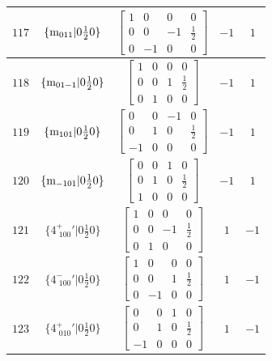 \documentclass[fleqn,8pt]{jsarticle}
\begin{document}
\begin{longtable}{ccccc}
$ 117 $ & $ \{{\rm m}_{011}|0 \frac{1}{2} 0\} $ & $ \begin{bmatrix} 1 & 0 & 0 & 0 \\ 0 & 0 & -1 & \frac{1}{2} \\ 0 & -1 & 0 & 0 \end{bmatrix} $ & $ -1 $ & $ 1 $ \\ \hline
$ 118 $ & $ \{{\rm m}_{01-1}|0 \frac{1}{2} 0\} $ & $ \begin{bmatrix} 1 & 0 & 0 & 0 \\ 0 & 0 & 1 & \frac{1}{2} \\ 0 & 1 & 0 & 0 \end{bmatrix} $ & $ -1 $ & $ 1 $ \\ \hline
$ 119 $ & $ \{{\rm m}_{101}|0 \frac{1}{2} 0\} $ & $ \begin{bmatrix} 0 & 0 & -1 & 0 \\ 0 & 1 & 0 & \frac{1}{2} \\ -1 & 0 & 0 & 0 \end{bmatrix} $ & $ -1 $ & $ 1 $ \\ \hline
$ 120 $ & $ \{{\rm m}_{-101}|0 \frac{1}{2} 0\} $ & $ \begin{bmatrix} 0 & 0 & 1 & 0 \\ 0 & 1 & 0 & \frac{1}{2} \\ 1 & 0 & 0 & 0 \end{bmatrix} $ & $ -1 $ & $ 1 $ \\ \hline
$ 121 $ & $ \{4^{+}_{\,\,100}{}'|0 \frac{1}{2} 0\} $ & $ \begin{bmatrix} 1 & 0 & 0 & 0 \\ 0 & 0 & -1 & \frac{1}{2} \\ 0 & 1 & 0 & 0 \end{bmatrix} $ & $ 1 $ & $ -1 $ \\ \hline
$ 122 $ & $ \{4^{-}_{\,\,100}{}'|0 \frac{1}{2} 0\} $ & $ \begin{bmatrix} 1 & 0 & 0 & 0 \\ 0 & 0 & 1 & \frac{1}{2} \\ 0 & -1 & 0 & 0 \end{bmatrix} $ & $ 1 $ & $ -1 $ \\ \hline
$ 123 $ & $ \{4^{+}_{\,\,010}{}'|0 \frac{1}{2} 0\} $ & $ \begin{bmatrix} 0 & 0 & 1 & 0 \\ 0 & 1 & 0 & \frac{1}{2} \\ -1 & 0 & 0 & 0 \end{bmatrix} $ & $ 1 $ & $ -1 $ \\ \hline

\end{longtable}
\end{document}
